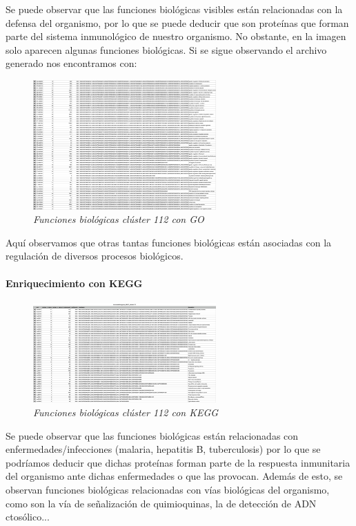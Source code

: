 Se puede observar que las funciones biológicas visibles están relacionadas con la defensa del organismo, por lo que se puede deducir que son proteínas que forman parte del sistema inmunológico de nuestro organismo. No obstante, en la imagen solo aparecen algunas funciones biológicas. Si se sigue observando el archivo generado nos encontramos con:

\begin{figure}
	\centering
	\includegraphics[width=70mm,scale=1.2]{figures/cluster112_GO_2.png}
	\caption{\textit{Funciones biológicas clúster 112 con GO}}
\end{figure}

Aquí observamos que otras tantas funciones biológicas están asociadas con la regulación de diversos procesos biológicos.

\paragraph{Enriquecimiento con KEGG}

\begin{figure}
	\centering
	\includegraphics[width=70mm,scale=1.2]{figures/cluster112_KEGG.png}
	\caption{\textit{Funciones biológicas clúster 112 con KEGG}}
\end{figure}

Se puede observar que las funciones biológicas están relacionadas con enfermedades/infecciones (malaria, hepatitis B, tuberculosis) por lo que se podríamos deducir que dichas proteínas forman parte de la respuesta inmunitaria del organismo ante dichas enfermedades o que las provocan.
Además de esto, se observan funciones biológicas relacionadas con vías biológicas del organismo, como son la vía de señalización de quimioquinas, la de detección de ADN ctosólico...

